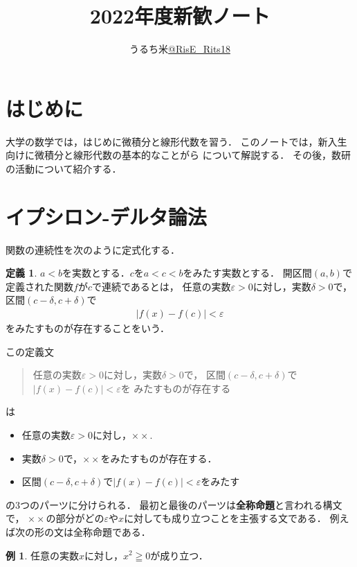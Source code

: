 \documentclass[11pt, a4paper, dvipdfmx]{jsarticle}
\theoremstyle{definition}
\newtheorem{Definition}[Axiom]{定義}
\newtheorem{Example}[Axiom]{例}
\newcommand{\e}{\varepsilon} %
\theoremstyle{mystyle}
\numberwithin{equation}{section} %
\begin{document}
\title{2022年度新歓ノート}
\author{うるち米\url{@RisE_Rits18}}


\maketitle
\section{はじめに}

大学の数学では，はじめに微積分と線形代数を習う．
このノートでは，新入生向けに微積分と線形代数の基本的なことがら
について解説する．
その後，数研の活動について紹介する．

\section{イプシロン-デルタ論法}\label{sec-cal}

関数の連続性を次のように定式化する．

\begin{Definition}\label{def-conti}
    $a<b$を実数とする．$c$を$a<c<b$をみたす実数とする．
    開区間$(a,b)$で定義された関数$f$が$c$で連続であるとは，
    任意の実数$\e>0$に対し，実数$\delta>0$で，
    区間$(c-\delta,c+\delta)$で
    \begin{align*}
        |f(x)-f(c)|<\e
    \end{align*}
    をみたすものが存在することをいう．
\end{Definition}
この定義文
\begin{quote}
    任意の実数$\e>0$に対し，実数$\delta>0$で，
    区間$(c-\delta,c+\delta)$で$|f(x)-f(c)|<\e$を
    みたすものが存在する
\end{quote}
は
\begin{itemize}
    \item 任意の実数$\e>0$に対し，$\times\times$. 
    \item 実数$\delta>0$で，$\times\times$をみたすものが存在する．
    \item 区間$(c-\delta,c+\delta)$で$|f(x)-f(c)|<\e$をみたす
\end{itemize}
の3つのパーツに分けられる．
最初と最後のパーツは\textbf{全称命題}と言われる構文で，
$\times\times$の部分がどの$\e$や$x$に対しても成り立つことを主張する文である．
例えば次の形の文は全称命題である．

\begin{Example}
    任意の実数$x$に対し，$x^2\geqq 0$が成り立つ．
\end{Example}
\end{document}
